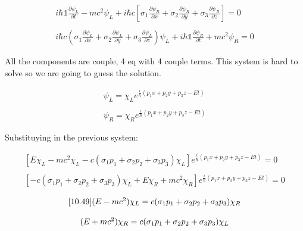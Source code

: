 \begin{equation}
  \begin{array}{c}
    i\hbar \mathbb{1} \frac{\partial \psi_L}{\partial t} - mc^2\psi_L + i\hbar c \left[\sigma_1\frac{\partial \psi_R}{\partial x}+\sigma_2\frac{\partial \psi_R}{\partial y}+\sigma_3\frac{\partial \psi_R}{\partial z}\right] = 0
    \\

    \\
    i\hbar c\left(\sigma_1 \frac{\partial \psi_L}{\partial x} + \sigma_2 \frac{\partial \psi_L}{\partial y}+ \sigma_3 \frac{\partial \psi_L}{\partial z}\right) \psi_L + i\hbar \mathbb{1} \frac{\partial \psi_R}{\partial t} + mc^2\psi_R = 0
  \end{array}
\end{equation}

All the components are couple, 4 eq with 4 couple terms. This system is hard to solve so we are going to guess the solution.

\begin{equation}
  \begin{array}{c}
    \psi_L = \chi_L e^{\frac{i}{\hbar}(p_1 x + p_2 y + p_3 z - Et)}
    \\

    \\
    \psi_R = \chi_R e^{\frac{i}{\hbar}(p_1 x + p_2 y + p_3 z - Et)}
  \end{array}
\end{equation}

Substituying in the previous system:

\begin{equation}
  \begin{array}{c}
    \left[E\chi_L - mc^2\chi_L- c\left(\sigma_1 p_1 + \sigma_2 p_2 + \sigma_3 p_3\right)\chi_L\right]e^{\frac{i}{\hbar}(p_1 x + p_2 y + p_3 z - Et)} = 0
    \\

    \\
    \left[-c\left( \sigma_1 p_1 + \sigma_2 p_2 + \sigma_3 p_3 \right)\chi_L + E\chi_R+ mc^2\chi_R\right] e^{\frac{i}{\hbar}(p_1 x + p_2 y + p_3 z - Et)} = 0
  \end{array}
\end{equation}

\begin{equation}
  \begin{array}{c}
    \ref{10.49}
    (E-mc^2) \chi_L = c (\sigma_1 p_1 + \sigma_2 p_2 + \sigma_3 p_3)\chi_R
    \\

    \\
    (E+mc^2) \chi_R = c (\sigma_1 p_1 + \sigma_2 p_2 + \sigma_3 p_3)\chi_L
  \end{array}
\end{equation}

